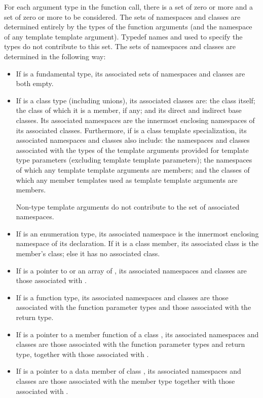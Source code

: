 \pnum
For each argument type  in the function call, there is a set of
zero or more 
and a set of zero or more 
to be considered. The sets of namespaces and classes are
determined entirely by the types of the function arguments (and the
namespace of any template template argument). Typedef names and
 used to specify the types do not
contribute to this set. The sets of namespaces and classes are
determined in the following way:
\begin{itemize}
\item If  is a fundamental type, its associated sets of
namespaces and classes are both empty.

\item If  is a class type (including unions), its associated
classes are: the class itself; the class of which it is a member, if
any; and its direct and indirect base classes. Its associated namespaces
are the innermost enclosing namespaces of its associated classes.
Furthermore, if  is a class template specialization, its
associated namespaces and classes also include: the namespaces and
classes associated with the types of the template arguments provided for
template type parameters (excluding template template parameters); the
namespaces of which any template template arguments are members; and the
classes of which any member templates used as template template
arguments are members. \begin{note} Non-type template arguments do not
contribute to the set of associated namespaces.\end{note}

\item If  is an enumeration type, its associated namespace is
the innermost enclosing namespace of its declaration. If it is a class member, its
associated class is the member's class; else it has no associated class.

\item If  is a pointer to  or an array of ,
its associated namespaces and classes are those associated with
.

\item If  is a function type, its associated namespaces and
classes are those associated with the function parameter types and those
associated with the return type.

\item If  is a pointer to a member function of a class
, its associated namespaces and classes are those associated
with the function parameter types and return type, together with those
associated with .

\item If  is a pointer to a data member of class , its
associated namespaces and classes are those associated with the member
type together with those associated with .
\end{itemize}
